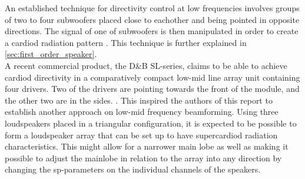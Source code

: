 An established technique for directivity control at low frequencies involves groups of two to four subwoofers placed close to eachother and being pointed in opposite directions. The signal of one of subwoofers is then manipulated in order to create a cardiod radiation pattern \citep{KS28}. This technique is further explained in \autoref{sec:first_order_speaker}.\\
A recent commercial product, the D\&B SL-series, claims to be able to achieve cardiod directivity in a comparatively compact low-mid line array unit containing four drivers. Two of the drivers are pointing towards the front of the module, and the other two are in the sides. \citep{SL_GSL}. This inspired the authors of this report to establish another approach on low-mid frequency beamforming. Using three loudspeakers placed in a triangular configuration, it is expected to be possible to form a loudspeaker array that can be set up to have supercardiod radiation characteristics. This might allow for a narrower main lobe as well as making it possible to adjust the mainlobe in relation to the array into any direction by changing the \gls{sp}-parameters on the individual channels of the speakers.






